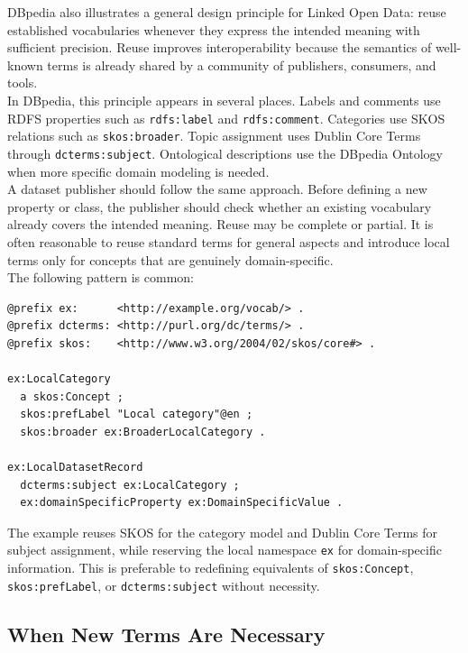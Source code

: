 \documentclass{scrbook}
\begin{document}
	DBpedia also illustrates a general design principle for Linked Open Data: reuse established vocabularies whenever they express the intended meaning with sufficient precision. Reuse improves interoperability because the semantics of well-known terms is already shared by a community of publishers, consumers, and tools.\\
	
	In DBpedia, this principle appears in several places. Labels and comments use RDFS properties such as \texttt{rdfs:label} and \texttt{rdfs:comment}. Categories use SKOS relations such as \texttt{skos:broader}. Topic assignment uses Dublin Core Terms through \texttt{dcterms:subject}. Ontological descriptions use the DBpedia Ontology when more specific domain modeling is needed.\\
	
	A dataset publisher should follow the same approach. Before defining a new property or class, the publisher should check whether an existing vocabulary already covers the intended meaning. Reuse may be complete or partial. It is often reasonable to reuse standard terms for general aspects and introduce local terms only for concepts that are genuinely domain-specific.\\
	
	The following pattern is common:
	
	\begin{lstlisting}
@prefix ex:      <http://example.org/vocab/> .
@prefix dcterms: <http://purl.org/dc/terms/> .
@prefix skos:    <http://www.w3.org/2004/02/skos/core#> .

ex:LocalCategory
  a skos:Concept ;
  skos:prefLabel "Local category"@en ;
  skos:broader ex:BroaderLocalCategory .
	
ex:LocalDatasetRecord
  dcterms:subject ex:LocalCategory ;
  ex:domainSpecificProperty ex:DomainSpecificValue .
	\end{lstlisting}
	
	The example reuses SKOS for the category model and Dublin Core Terms for subject assignment, while reserving the local namespace \texttt{ex} for domain-specific information. This is preferable to redefining equivalents of \texttt{skos:Concept}, \texttt{skos:prefLabel}, or \texttt{dcterms:subject} without necessity.
	
	\subsection{When New Terms Are Necessary}
	
\end{document}

